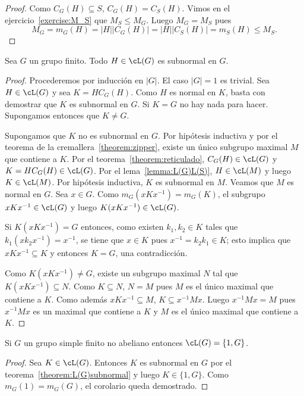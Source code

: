 \begin{proof}
	Como $C_G(H)\subseteq S$, $C_G(H)=C_S(H)$. Vimos en el
	ejercicio~\ref{exercise:M_S} que $M_S\leq M_G$. Luego $M_G=M_S$ pues 
	\[
		M_G=m_G(H)=|H||C_G(H)|=|H||C_S(H)|=m_S(H)\leq M_S.
	\]
\end{proof}

\begin{theorem}
	\label{theorem:L(G)subnormal}
	Sea $G$ un grupo finito. Todo $H\in\cL(G)$ es subnormal en $G$.
\end{theorem}

\begin{proof}
	Procederemos por inducción en $|G|$. El caso $|G|=1$ es trivial.  Sea
	$H\in\cL(G)$ y sea $K=HC_G(H)$. Como $H$ es normal en $K$, basta con
	demostrar que $K$ es subnormal en $G$. Si $K=G$ no hay nada para hacer.
	Supongamos entonces que $K\ne G$. 

	Supongamos que $K$ no es subnormal en $G$. Por hipótesis inductiva y por el
	teorema de la cremallera~\ref{theorem:zipper}, existe un único subgrupo
	maximal $M$ que contiene a $K$.  Por el teorema~\ref{theorem:reticulado},
	$C_G(H)\in\cL(G)$ y $K=HC_G(H)\in\cL(G)$. Por el lema~\ref{lemma:L(G)L(S)},
	$H\in\cL(M)$ y luego $K\in\cL(M)$. Por hipótesis inductiva, $K$ es
	subnormal en $M$.  Veamos que $M$ es normal en $G$. Sea $x\in G$. Como
	$m_G(xKx^{-1})=m_G(K)$, el subgrupo $xKx^{-1}\in\cL(G)$ y luego
	$K(xKx^{-1})\in\cL(G)$. 
	
	Si $K(xKx^{-1})=G$ entonces, como existen $k_1,k_2\in K$ tales que
	$k_1(xk_2x^{-1})=x^{-1}$, se tiene que $x\in K$ pues $x^{-1}=k_2k_1\in K$;
	esto implica que $xKx^{-1}\subseteq K$ y entonces $K=G$, una contradicción. 

	Como $K(xKx^{-1})\ne G$, existe un subgrupo maximal $N$ tal que
	$K(xKx^{-1})\subseteq N$. Como $K\subseteq N$, $N=M$ pues $M$ es el único
	maximal que contiene a $K$. Como además $xKx^{-1}\subseteq M$, $K\subseteq
	x^{-1}Mx$. Luego $x^{-1}Mx=M$ pues $x^{-1}Mx$ es un maximal que contiene a
	$K$ y $M$ es el único maximal que contiene a $K$. 
\end{proof}

\begin{corollary}
	Si $G$ un grupo simple finito no abeliano entonces $\cL(G)=\{1,G\}$. 
\end{corollary}

\begin{proof}
	Sea $K\in\cL(G)$. Entonces $K$ es subnormal en $G$ por el
	teorema~\ref{theorem:L(G)subnormal} y luego $K\in\{1,G\}$. Como
	$m_G(1)=m_G(G)$, el corolario queda demostrado.
\end{proof}

